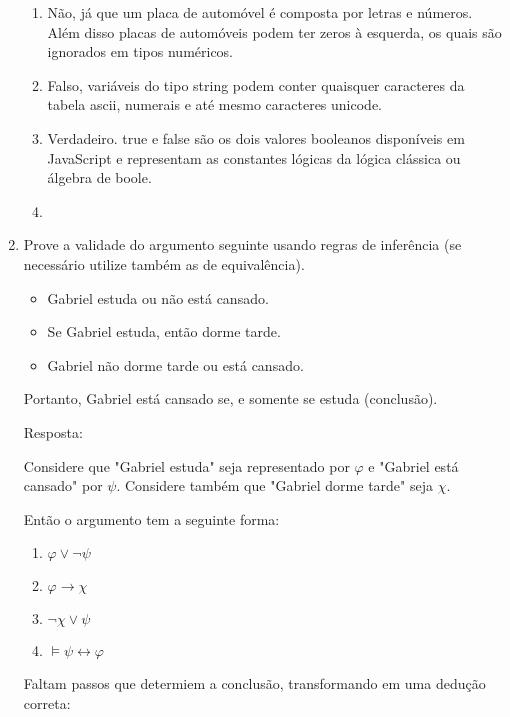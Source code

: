\documentclass[11pt]{article}
\begin{document}
\begin{enumerate}
	\begin{enumerate}[label=(\alph*)]
  		\item Não, já que um placa de automóvel é composta por letras e números. Além disso placas de automóveis podem ter zeros à esquerda, os quais são ignorados em tipos numéricos.
  		\item Falso, variáveis do tipo string podem conter quaisquer caracteres da tabela ascii, numerais e até mesmo caracteres unicode.
  		\item Verdadeiro. true e false são os dois valores booleanos disponíveis em JavaScript e representam as constantes lógicas da lógica clássica ou álgebra de boole. 
  		\item 
	\end{enumerate}

\item 
	Prove a validade do argumento seguinte usando regras de inferência (se necessário utilize também as de equivalência).
	\begin{itemize}
		\item Gabriel estuda ou não está cansado.
		\item Se Gabriel estuda, então dorme tarde.
		\item Gabriel não dorme tarde ou está cansado. 
	\end{itemize}
	Portanto, Gabriel está cansado se, e somente se estuda (conclusão).

	Resposta:

	Considere que "Gabriel estuda" seja representado por $\varphi$ e "Gabriel está cansado" por $\psi$. Considere também que "Gabriel dorme tarde" seja $\chi$.   

	Então o argumento tem a seguinte forma:
	\begin{enumerate}[label=\roman*]
  		\item $\varphi \vee \neg \psi$ 
  		\item $\varphi \rightarrow \chi$
  		\item $\neg \chi \vee \psi$ 
		\item $\models \psi \leftrightarrow \varphi$ 
	\end{enumerate}

	Faltam passos que determiem a conclusão, transformando em uma dedução correta:


\end{enumerate}
\end{document}
